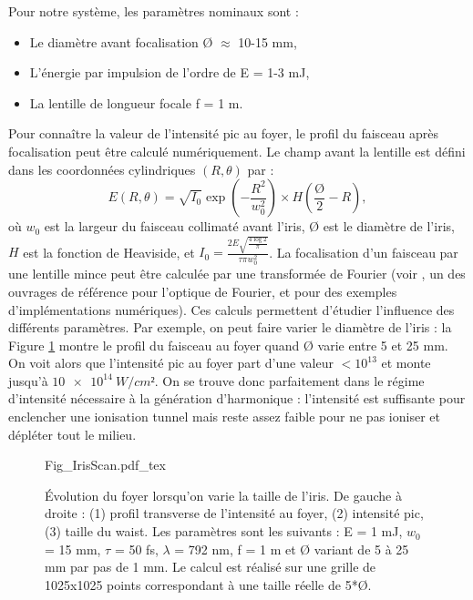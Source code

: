 Pour notre système, les paramètres nominaux sont :
\begin{itemize}
\item Le diamètre avant focalisation \O{} $\approx$ 10-15 mm,
\item L'énergie par impulsion de l'ordre de E = 1-3 mJ,
\item La lentille de longueur focale f = 1 m. \\
\end{itemize}
Pour connaître la valeur de l'intensité pic au foyer, le profil du faisceau après focalisation peut être calculé numériquement. Le champ avant la lentille est défini dans les coordonnées cylindriques $(R,\theta)$ par :
\begin{equation*}
E(R,\theta) = \sqrt{I_0} \exp{\left(-\frac{R^2}{w_0^2}\right)}\times H(\frac{\mbox{\O}}{2}-R),
\end{equation*}
où $w_0$ est la largeur du faisceau collimaté avant l'iris, \O{}  est le diamètre de l'iris, $H$ est la fonction de Heaviside, et $I_0 = \frac{2E\sqrt{\frac{4\log{2}}{\pi}}}{\tau\pi w_0^2}$.
La focalisation d'un faisceau par une lentille mince peut être calculée par une transformée de Fourier (voir , un des ouvrages de référence pour l'optique de Fourier, et  pour des exemples d'implémentations numériques). Ces calculs permettent d'étudier l'influence des différents paramètres. Par exemple, on peut faire varier le diamètre de l'iris : la Figure \ref{Fig:IrisScan} montre le profil du faisceau au foyer quand \O{} varie entre 5 et 25 mm. On voit alors que l'intensité pic au foyer part d'une valeur $<10^{13}$ et monte jusqu'à $\SI{10e14}{W/cm²}$. On se trouve donc parfaitement dans le régime d'intensité nécessaire à la génération d'harmonique : l'intensité est suffisante pour enclencher une ionisation tunnel mais reste assez faible pour ne pas ioniser et dépléter tout le milieu.

\begin{figure}[!ht]
\centering
\def\svgwidth{\columnwidth}
{Fig_IrisScan.pdf_tex}
\caption{\'{E}volution du foyer lorsqu'on varie la taille de l'iris. De gauche à droite : (1) profil transverse de l'intensité au foyer, (2) intensité pic, (3) taille du waist. Les paramètres sont les suivants : E = 1 mJ, $w_0$ = 15 mm, $\tau$ = 50 fs, $\lambda$ = 792 nm, f = 1 m et \O{} variant de 5 à 25 mm par pas de 1 mm. Le calcul est réalisé sur une grille de 1025x1025 points correspondant à une taille réelle de 5*\O{}.}
\label{Fig:IrisScan}
\end{figure}

